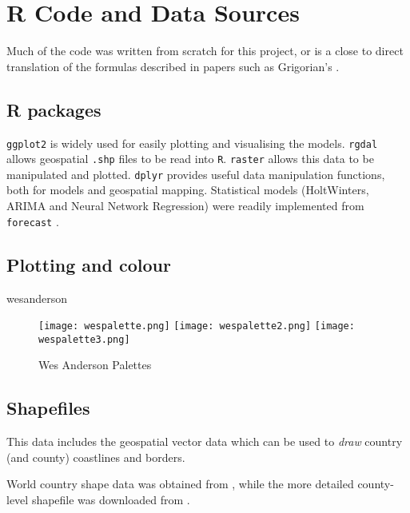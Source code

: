 \section{R Code and Data Sources}
\label{ch:codesource}

Much of the code was written from scratch for this project, or is a close to direct translation of the formulas described in papers such as Grigorian's \cite{grigor20}.

\subsection{R packages}

\verb|ggplot2|  \cite{ggplot2} is widely used for easily plotting and visualising the models. \verb|rgdal| \cite{rgdal} allows geospatial \verb|.shp| files to be read into \verb|R|. \verb|raster| \cite{raster} allows this data to be manipulated and plotted. \verb|dplyr| \cite{dplyr}  provides useful data manipulation functions, both for models and geospatial mapping. Statistical models (HoltWinters, ARIMA and Neural Network Regression) were readily implemented from \verb|forecast| \cite{forecasting}.

\subsection{Plotting and colour}

wesanderson \cite{wesanderson20}

\begin{figure}[!htb]
  \texttt{[image: wespalette.png]} \label{fig:wespalette}
  \texttt{[image: wespalette2.png]} \label{fig:wespalette2}
  \texttt{[image: wespalette3.png]} \label{fig:wespalette3}
\endminipage
\caption{Wes Anderson Palettes}
\end{figure}


\subsection{Shapefiles}

This data includes the geospatial vector data which can be used to \textit{draw} country (and county) coastlines and borders. 

World country shape data was obtained from \cite{countryshape}, while the more detailed county-level shapefile was downloaded from \cite{countyshape}.



